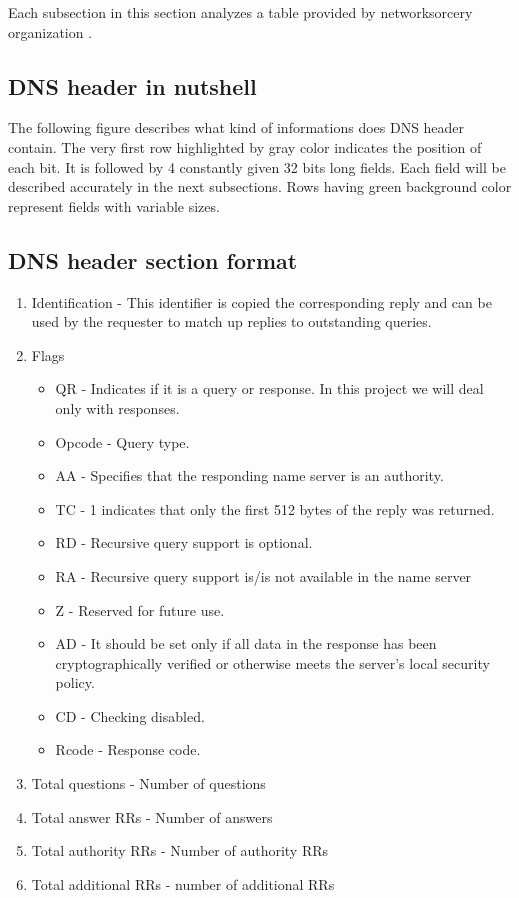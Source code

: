 \documentclass[11pt,a4paper]{article}
\begin{document}
Each subsection in this section analyzes a table provided by networksorcery organization \cite{INFORMATIONS}.

\subsection{DNS header in nutshell}

The following figure describes what kind of informations does DNS header contain. The very first row highlighted by gray color indicates the position of each bit. It is followed by 4 constantly given 32 bits long fields. Each field will be described accurately in the next subsections. Rows having green background color represent fields with variable sizes. \\

\newpage

\subsection{DNS header section format}
\label{HEADER}

\begin{enumerate}
   \item Identification - This identifier is copied the corresponding reply and can be used by the requester to match up replies to outstanding queries.
   \item Flags
   \begin{itemize}
     \item QR - Indicates if it is a query or response. In this project we will deal only with responses.
     \item Opcode - Query type.
     \item AA - Specifies that the responding name server is an authority.
     \item TC - 1 indicates that only the first 512 bytes of the reply was returned.
     \item RD - Recursive query support is optional.
     \item RA - Recursive query support is/is not available in the name server
     \item Z - Reserved for future use.
     \item AD - It should be set only if all data in the response has been cryptographically verified or otherwise meets the server's local security policy.
     \item CD - Checking disabled.
     \item Rcode - Response code.
   \end{itemize}
   \item Total questions - Number of questions
   \item Total answer RRs - Number of answers
   \item Total authority RRs - Number of authority RRs
   \item Total additional RRs - number of additional RRs
\end{enumerate}
\end{document}
